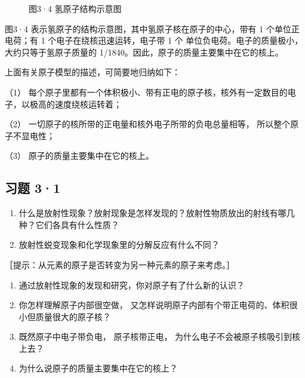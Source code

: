 \begin{figure}
\centering
{}
\caption{图3·4 氢原子结构示意图}
\end{figure}

图3·4 表示氢原子的结构示意图，其中氢原子核在原子的中心，带有 1
个单位正电荷；有 1 个电子在绕核迅速运转，电子带 1 个
单位负电荷。电子的质量极小，大约只等于氢原子质量的
1/1840。因此，原子的质量主要集中在它的核上。

上面有关原子模型的描述，可简要地归纳如下：

（1）
每个原子里都有一个体积极小、带有正电的原子核，核外有一定数目的电子，以极高的速度绕核运转着；

（2） 一切原子的核所带的正电量和核外电子所带的负电总量相等，
所以整个原子不显电性；

（3） 原子的质量主要集中在它的核上。

\subsection{习题 3·1}

\begin{enumerate}
\item
  什么是放射性现象？放射现象是怎样发现的？放射性物质放出的射线有哪几种？它们各具有什么性质？
\item
  放射性蜕变现象和化学现象里的分解反应有什么不同？
\end{enumerate}

［提示：从元素的原子是否转变为另一种元素的原子来考虑。］

\begin{enumerate}[start=3]
\item
  通过放射性现象的发现和研究，你对原子有了什么新的认识？
\item
  你怎样理解原子内部很空做，
  又怎样说明原子内部有个带正电荷的、体积很小但质量很大的原子核？
\item
  既然原子中电子带负电， 原子核带正电，
  为什么电子不会被原子核吸引到核上去？
\item
  为什么说原子的质量主要集中在它的核上？
\end{enumerate}

